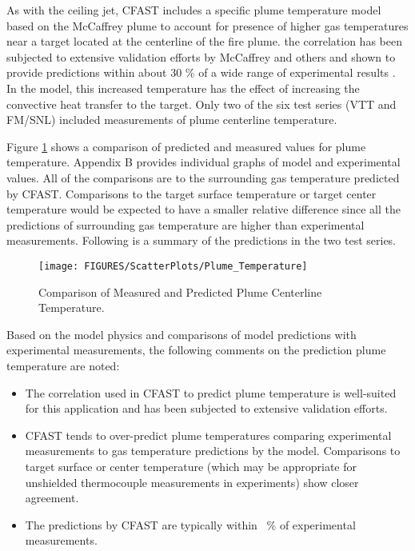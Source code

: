 As with the ceiling jet, CFAST includes a specific plume temperature model based on the McCaffrey plume \cite{Baum:1989, McCaffrey:1983} to account for presence of higher gas temperatures near a target located at the centerline of the fire plume. the correlation has been subjected to extensive validation efforts by McCaffrey \cite{Baum:1989} and others \cite{Valid:Davis_Plumes} and shown to provide predictions within about 30 \% of a wide range of experimental results \cite{Valid:Davis_Plumes}. In the model, this increased temperature has the effect of increasing the convective heat transfer to the target. Only two of the six test series (VTT and FM/SNL) included measurements of plume centerline temperature.

Figure \ref{fig:Plume_Temp_Scatter} shows a comparison of predicted and measured values for plume temperature. Appendix B provides individual graphs of model and experimental values. All of the comparisons are to the surrounding gas temperature predicted by CFAST. Comparisons to the target surface temperature or target center temperature would be expected to have a smaller relative difference since all the predictions of surrounding gas temperature are higher than experimental measurements. Following is a summary of the predictions in the two test series.
\label{Plume Temperature}

\begin{figure}
\begin{center}
\texttt{[image: FIGURES/ScatterPlots/Plume\_Temperature]}  \\
\end{center}
\caption{Comparison of Measured and Predicted Plume Centerline Temperature.} \label{fig:Plume_Temp_Scatter}
\end{figure}

Based on the model physics and comparisons of model predictions with experimental measurements, the following comments on the prediction plume temperature are noted:

\begin{itemize}
\item The correlation used in CFAST to predict plume temperature is well-suited for this application and has been subjected to extensive validation efforts.
\item CFAST tends to over-predict plume temperatures comparing experimental measurements to gas temperature predictions by the model.  Comparisons to target surface or center temperature (which may be appropriate for unshielded thermocouple measurements in experiments) show closer agreement.
\item The predictions by CFAST are typically within \Plumeavg~\% of experimental measurements.
\end{itemize}

